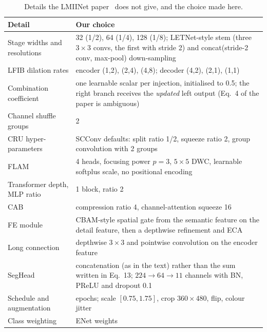 \documentclass{article}
\begin{document}
\begin{table}[h]
\caption{Details the LMIINet paper~\cite{qiu2024lmiinet} does not give, and the choice made here.}
\centering
\scriptsize
\begin{tabular}{p{}p{}}
\toprule
Detail & Our choice \\
\midrule
Stage widths and resolutions & 32 (1/2), 64 (1/4), 128 (1/8); LETNet-style stem (three $3{\times}3$ convs, the first with stride 2) and concat(stride-2 conv, max-pool) down-sampling \\
LFIB dilation rates & encoder (1,2), (2,4), (4,8); decoder (4,2), (2,1), (1,1) \\
Combination coefficient & one learnable scalar per injection, initialised to 0.5; the right branch receives the \emph{updated} left output (Eq.~4 of the paper is ambiguous) \\
Channel shuffle groups & 2 \\
CRU hyper-parameters & SCConv defaults: split ratio 1/2, squeeze ratio 2, group convolution with 2 groups \\
FLAM & 4 heads, focusing power $p=3$, $5{\times}5$ DWC, learnable softplus scale, no positional encoding \\
Transformer depth, MLP ratio & 1 block, ratio 2 \\
CAB & compression ratio 4, channel-attention squeeze 16 \\
FE module & CBAM-style spatial gate from the semantic feature on the detail feature, then a depthwise refinement and ECA \\
Long connection & depthwise $3{\times}3$ and pointwise convolution on the encoder feature \\
SegHead & concatenation (as in the text) rather than the sum written in Eq.~13; $224\!\to\!64\!\to\!11$ channels with BN, PReLU and dropout 0.1 \\
Schedule and augmentation & \Epochs{} epochs; scale $[0.75,1.75]$, crop $360{\times}480$, flip, colour jitter \\
Class weighting & ENet weights \\
\bottomrule
\end{tabular}
\end{table}
\end{document}
